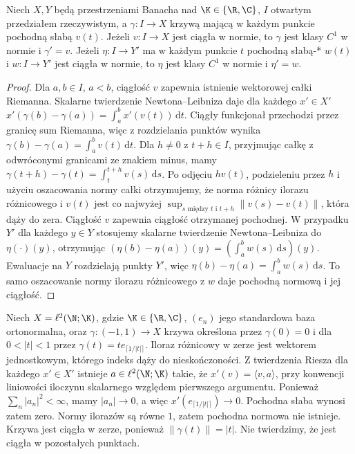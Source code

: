 \begin{stwierdzenie}
\label{prop:weak-to-strong-derivative14}
Niech $X,Y$ będą przestrzeniami Banacha nad $\K\in\{\R,\C\}$,
$I$ otwartym przedziałem rzeczywistym, a $\gamma:I\to X$ krzywą
mającą w każdym punkcie pochodną słabą $v(t)$.
Jeżeli $v:I\to X$ jest ciągła w normie, to $\gamma$
jest klasy $C^1$ w normie i $\gamma'=v$.
Jeżeli $\eta:I\to Y'$ ma w każdym punkcie $t$ pochodną
słabą-* $w(t)$ i $w:I\to Y'$ jest ciągła w normie,
to $\eta$ jest klasy $C^1$ w normie i $\eta'=w$.
\end{stwierdzenie}
\begin{proof}
Dla $a,b\in I$, $a<b$, ciągłość $v$ zapewnia istnienie
wektorowej całki Riemanna. Skalarne twierdzenie
Newtona--Leibniza daje dla każdego $x'\in X'$
$x'(\gamma(b)-\gamma(a))=\int_a^b x'(v(t))\,\mathrm dt$.
Ciągły funkcjonał przechodzi przez granicę sum Riemanna,
więc z rozdzielania punktów wynika
$\gamma(b)-\gamma(a)=\int_a^b v(t)\,\mathrm dt$.
Dla $h\ne0$ z $t+h\in I$, przyjmując całkę z odwróconymi
granicami ze znakiem minus, mamy
$\gamma(t+h)-\gamma(t)=\int_t^{t+h}v(s)\,\mathrm ds$.
Po odjęciu $hv(t)$, podzieleniu przez $h$ i użyciu
oszacowania normy całki otrzymujemy, że norma różnicy
ilorazu różnicowego i $v(t)$ jest co najwyżej
$\sup_{s\text{ między }t\text{ i }t+h}\|v(s)-v(t)\|$,
która dąży do zera. Ciągłość $v$ zapewnia ciągłość otrzymanej pochodnej.
W przypadku $Y'$ dla każdego $y\in Y$ stosujemy
skalarne twierdzenie Newtona--Leibniza do $\eta(\cdot)(y)$,
otrzymując $(\eta(b)-\eta(a))(y)=(\int_a^b w(s)\,\mathrm ds)(y)$.
Ewaluacje na $Y$ rozdzielają punkty $Y'$, więc
$\eta(b)-\eta(a)=\int_a^b w(s)\,\mathrm ds$.
To samo oszacowanie normy ilorazu różnicowego z $w$
daje pochodną normową i jej ciągłość.
\end{proof}

\begin{przyklad}
\label{ex:weak-not-norm-derivative14}
Niech $X=\ell^2(\N;\K)$, gdzie $\K\in\{\R,\C\}$,
$(e_n)$ jego standardowa baza ortonormalna,
oraz $\gamma:(-1,1)\to X$ krzywa określona przez $\gamma(0)=0$ i dla $0<|t|<1$ przez
$\gamma(t)=t e_{\lceil1/|t|\rceil}$. Iloraz różnicowy
w zerze jest wektorem jednostkowym, którego indeks
dąży do nieskończoności. Z twierdzenia Riesza dla każdego $x'\in X'$ istnieje
$a\in\ell^2(\N;\K)$ takie, że $x'(v)=\langle v,a\rangle$,
przy konwencji liniowości iloczynu skalarnego względem
pierwszego argumentu. Ponieważ $\sum_n|a_n|^2<\infty$,
mamy $|a_n|\to0$, a więc $x'(e_{\lceil1/|t|\rceil})\to0$.
Pochodna słaba wynosi zatem zero. Normy ilorazów są równe $1$, zatem pochodna
normowa nie istnieje. Krzywa jest ciągła w zerze,
ponieważ $\|\gamma(t)\|=|t|$. Nie twierdzimy, że jest
ciągła w pozostałych punktach.
\end{przyklad}

